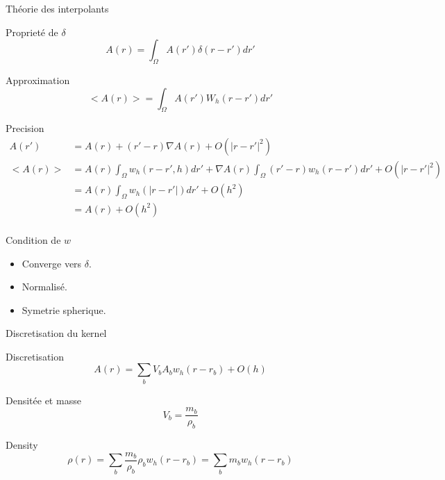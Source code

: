\begin{frame}[shrink]{Théorie des interpolants}
\begin{block}{Proprieté de $\delta$}
  \begin{equation*}
 A(r)=\int_{\Omega} A(r')\delta(r-r')dr'
 \end{equation*}
\end{block}

\begin{block}{Approximation}
\begin{equation*}
 <A(r)>=\int_{\Omega} A(r')W_h(r-r')dr'
 \end{equation*}
\end{block}

\begin{block}{Precision}
 \begin{align*}
  A(r')&=A(r)+(r'-r)\nabla A(r)+O(|r-r'|^2)\\
  <A(r)>&=A(r)\int_{\Omega}w_{h}(r-r',h)dr'+\nabla A(r)\int_{\Omega}(r'-r)w_{h}(r-r')dr'+O(|r-r'|^2)\\
  &=A(r)\int_{\Omega} w_{h}(|r-r'|)dr'+O(h^2)\\
  &=A(r)+O(h^2)\\
 \end{align*}
\end{block}

\begin{block}{Condition de $w$}
\begin{itemize}
 \item Converge vers $\delta$.
 \item Normalisé.
 \item Symetrie spherique.
\end{itemize}
\end{block}

 
\end{frame}

\begin{frame}{Discretisation du kernel}
 
 \begin{block}{Discretisation}
 \begin{equation*}
  A(r)=\sum _{b}V_{b}A_bw_{h}(r-r_b)+O(h)
  \end{equation*}
 \end{block}

 \begin{block}{Densitée et masse}
 \begin{equation*}
  V_{b}=\frac{m_{b}}{\rho_{b}}
 \end{equation*}
 \end{block}
 
 \begin{block}{Density}
  \begin{equation*}
   \rho(r)=\sum_b \frac{m_b}{\rho_{b}}\rho_{b}w_{h}(r-r_b)=\sum_b m_bw_{h}(r-r_b)
  \end{equation*}
 \end{block}

\end{frame}

